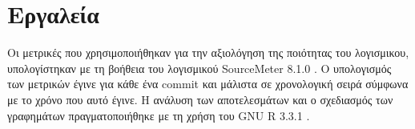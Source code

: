 \section{Εργαλεία}

Οι μετρικές που χρησιμοποιήθηκαν για την αξιολόγηση της ποιότητας του
λογισμικου, υπολογίστηκαν με
τη βοήθεια του λογισμικού SourceMeter 8.1.0 \cite{SOURCEMETER}. Ο
υπολογισμός των μετρικών έγινε για κάθε ένα commit και μάλιστα σε
χρονολογική σειρά σύμφωνα με το χρόνο που αυτό έγινε. Η ανάλυση των
αποτελεσμάτων και ο σχεδιασμός των γραφημάτων πραγματοποιήθηκε με τη
χρήση του GNU R 3.3.1 \cite{R}.
